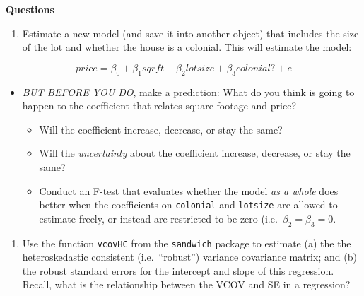 \documentclass[
]{book}
\newenvironment{Shaded}{\begin{snugshade}}{\end{snugshade}}
\newcommand{\AttributeTok}[1]{\textcolor[rgb]{0.77,0.63,0.00}{#1}}
\newcommand{\DecValTok}[1]{\textcolor[rgb]{0.00,0.00,0.81}{#1}}
\newcommand{\FloatTok}[1]{\textcolor[rgb]{0.00,0.00,0.81}{#1}}
\newcommand{\FunctionTok}[1]{\textcolor[rgb]{0.00,0.00,0.00}{#1}}
\newcommand{\NormalTok}[1]{#1}
\newcommand{\OtherTok}[1]{\textcolor[rgb]{0.56,0.35,0.01}{#1}}
\newcommand{\SpecialCharTok}[1]{\textcolor[rgb]{0.00,0.00,0.00}{#1}}
\newcommand{\StringTok}[1]{\textcolor[rgb]{0.31,0.60,0.02}{#1}}
\providecommand{\tightlist}{%
  \setlength{\itemsep}{0pt}\setlength{\parskip}{0pt}}
\theoremstyle{definition}
\theoremstyle{definition}
\theoremstyle{definition}
\theoremstyle{definition}
\theoremstyle{remark}
\begin{document}
\textbf{Questions}

\begin{enumerate}
\def\labelenumi{\arabic{enumi}.}
\tightlist
\item
  Estimate a new model (and save it into another object) that includes the size of the lot and whether the house is a colonial. This will estimate the model:
\end{enumerate}

\[
  price = \beta_{0} + \beta_{1} sqrft + \beta_{2} lotsize + \beta_{3} colonial? + e
\]

\begin{itemize}
\tightlist
\item
  \emph{BUT BEFORE YOU DO}, make a prediction: What do you think is going to happen to the coefficient that relates square footage and price?

  \begin{itemize}
  \tightlist
  \item
    Will the coefficient increase, decrease, or stay the same?
  \item
    Will the \emph{uncertainty} about the coefficient increase, decrease, or stay the same?
  \item
    Conduct an F-test that evaluates whether the model \emph{as a whole} does better when the coefficients on \texttt{colonial} and \texttt{lotsize} are allowed to estimate freely, or instead are restricted to be zero (i.e.~\(\beta_{2} = \beta_{3} = 0\).
  \end{itemize}
\end{itemize}

\begin{enumerate}
\def\labelenumi{\arabic{enumi}.}
\setcounter{enumi}{1}
\tightlist
\item
  Use the function \texttt{vcovHC} from the \texttt{sandwich} package to estimate (a) the the heteroskedastic consistent (i.e.~``robust'') variance covariance matrix; and (b) the robust standard errors for the intercept and slope of this regression. Recall, what is the relationship between the VCOV and SE in a regression?
\end{enumerate}

\begin{Shaded}
\end{Shaded}
\end{document}
